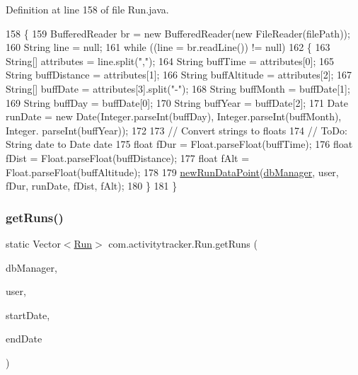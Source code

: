 Definition at line 158 of file Run.\+java.


\begin{DoxyCode}
158                                                                                                            
                                          \{
159         BufferedReader br = \textcolor{keyword}{new} BufferedReader(\textcolor{keyword}{new} FileReader(filePath));
160         String line = null;  
161         \textcolor{keywordflow}{while} ((line = br.readLine()) != null)  
162         \{
163             String[] attributes = line.split(\textcolor{stringliteral}{","});
164             String buffTime = attributes[0];
165             String buffDistance = attributes[1];
166             String buffAltitude = attributes[2];
167             String[] buffDate = attributes[3].split(\textcolor{stringliteral}{"-"});
168             String buffMonth = buffDate[1];
169             String buffDay = buffDate[0];
170             String buffYear = buffDate[2];
171             Date runDate = \textcolor{keyword}{new} Date(Integer.parseInt(buffDay), Integer.parseInt(buffMonth), Integer.
      parseInt(buffYear));
172 
173             \textcolor{comment}{// Convert strings to floats}
174             \textcolor{comment}{// ToDo: String date to Date date}
175             \textcolor{keywordtype}{float} fDur = Float.parseFloat(buffTime);
176             \textcolor{keywordtype}{float} fDist = Float.parseFloat(buffDistance);
177             \textcolor{keywordtype}{float} fAlt = Float.parseFloat(buffAltitude);
178 
179             \mbox{\hyperlink{classcom_1_1activitytracker_1_1_run_a5dea6f1860431103d553ce770382afe0}{newRunDataPoint}}(\mbox{\hyperlink{classcom_1_1activitytracker_1_1_run_ab90e32eda9f4c671ae3575f971edca6b}{dbManager}}, user, fDur, runDate, fDist, fAlt);
180         \} 
181     \}
\end{DoxyCode}
\mbox{\label{classcom_1_1activitytracker_1_1_run_a1aa1fb01eabff586e16d88f19f7df743}} 
\subsubsection{\texorpdfstring{get\+Runs()}{getRuns()}}
{\footnotesize\ttfamily static Vector$<$\mbox{\hyperlink{classcom_1_1activitytracker_1_1_run}{Run}}$>$ com.\+activitytracker.\+Run.\+get\+Runs (\begin{DoxyParamCaption}\item[{final \mbox{\hyperlink{classcom_1_1activitytracker_1_1_d_b_manager}{D\+B\+Manager}}}]{db\+Manager,  }\item[{final \mbox{\hyperlink{classcom_1_1activitytracker_1_1_user}{User}}}]{user,  }\item[{final Date}]{start\+Date,  }\item[{final Date}]{end\+Date }\end{DoxyParamCaption})\hspace{0.3cm}{\ttfamily [static]}}

